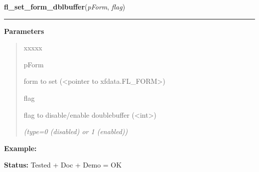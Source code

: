 \hspace{.8\funcindent}\begin{boxedminipage}{\funcwidth}

    \raggedright \textbf{fl\_set\_form\_dblbuffer}(\textit{pForm}, \textit{flag})

    \vspace{-1.5ex}

    \rule{\textwidth}{0.5\fboxrule}
\setlength{\parskip}{2ex}
\setlength{\parskip}{1ex}
      \textbf{Parameters}
      \vspace{-1ex}

      \begin{quote}
        \begin{Ventry}{xxxxx}

          \item[pForm]

          form to set ({\textless}pointer to xfdata.FL\_FORM{\textgreater})

          \item[flag]

          flag to disable/enable doublebuffer 
          ({\textless}int{\textgreater})

            {\it (type=0 (disabled) or 1 (enabled))}

        \end{Ventry}

      \end{quote}

\textbf{Example:} 

\textbf{Status:} Tested + Doc + Demo = OK



    \end{boxedminipage}

    \label{xformslib:library:fl_prepare_form_window}

    \vspace{0.5ex}

